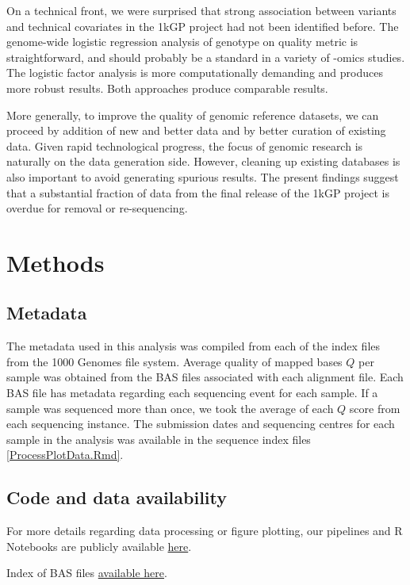 \documentclass[9pt,lineno]{elife}
\begin{document}
On a technical front, we were surprised that strong association between variants and technical covariates in the 1kGP project had not been identified before. 
The genome-wide logistic regression analysis of genotype on quality metric is straightforward, and should probably be a standard in a variety of -omics studies. The logistic factor analysis is more computationally demanding and produces more robust results. Both approaches produce comparable results.  

More generally, to improve the quality of genomic reference datasets, we can proceed by addition of new and better data and by better curation of existing data.
Given rapid technological progress, the focus of genomic research is naturally on the data generation side. 
However, cleaning up existing databases is also important to avoid generating spurious results. 
The present findings suggest that a substantial fraction of data from the final release of the 1kGP project is overdue for removal or re-sequencing.


\section{Methods}
\subsection{Metadata}
The metadata used in this analysis was compiled from each of the index files from the 1000 Genomes file system. 
Average quality of mapped bases $Q$ per sample was obtained from the BAS files associated with each alignment file. 
Each BAS file has metadata regarding each sequencing event for each sample. 
If a sample was sequenced more than once, we took the average of each $Q$ score from each sequencing instance. 
The submission dates and sequencing centres for each sample in the analysis was available in the sequence index files \ref{ProcessPlotData.Rmd}.

\subsection{Code and data availability}
For more details regarding data processing or figure plotting, our pipelines and R Notebooks are publicly available \href{https://github.com/LukeAndersonTrocme/QualityPaper}{here}.

Index of BAS files \href{http://ftp.1000genomes.ebi.ac.uk/vol1/ftp/data_collections/1000_genomes_project/1000genomes.low_coverage.GRCh38DH.alignment.index}{available here}.
\end{document}
